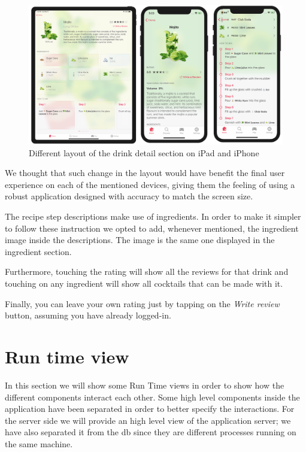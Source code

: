 \documentclass[paper=a4, fontsize=12pt]{scrartcl}
\numberwithin{equation}{section}		%
\numberwithin{figure}{section}			%
\numberwithin{table}{section}				%
\begin{document}
\begin{figure}
\begin{center}
    \includegraphics[width=\textwidth]{UI/UI-Drink.png}
    \caption{Different layout of the drink detail section on iPad and iPhone}
    \label{Drink detail section}
\end{center}
\end{figure}

We thought that such change in the layout would have benefit the final user experience on each of the mentioned devices, giving them the feeling of using a robust application designed with accuracy to match the screen size.

The recipe step descriptions make use of ingredients. In order to make it simpler to follow these instruction we opted to add, whenever mentioned, the ingredient image inside the descriptions. The image is the same one displayed in the ingredient section.

Furthermore, touching the rating will show all the reviews for that drink and touching on any ingredient will show all cocktails that can be made with it.

Finally, you can leave your own rating just by tapping on the \textit{Write review} button, assuming you have already logged-in. 

\clearpage
\section{Run time view}
In this section we will show some Run Time views in order to show how the different components interact each other. Some high level components inside the application have been separated in order to better specify the interactions. For the server side we will provide an high level view of the application server; we have also separated it from the db since they are different processes running on the same machine.
\end{document}
